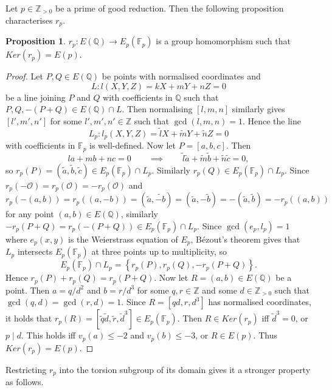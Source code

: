 \documentclass{article}
\newcommand{\F}{\mathbb{F}}
\newcommand{\Z}{\mathbb{Z}}
\newcommand{\Q}{\mathbb{Q}}
\newcommand{\rb}[1]{\left( #1 \right)}
\renewcommand{\sb}[1]{\left[ #1 \right]}
\newcommand{\cb}[1]{\left\{ #1 \right\}}
\theoremstyle{definition}
\newtheorem{proposition}{Proposition}[subsection]
\begin{document}
\pagebreak

Let $ p \in \Z_{> 0} $ be a prime of good reduction. Then the following proposition characterises $ r_p $.

\begin{proposition}
$ r_p : E\rb{\Q} \to E_p\rb{\F_p} $ is a group homomorphism such that $ Ker\rb{r_p} = E\rb{p} $.
\end{proposition}

\begin{proof}
Let $ P, Q \in E\rb{\Q} $ be points with normalised coordinates and
$$ L : l\rb{X, Y, Z} = kX + mY + nZ = 0 $$
be a line joining $ P $ and $ Q $ with coefficients in $ \Q $ such that $ P, Q, -\rb{P + Q} \in E\rb{\Q} \cap L $. Then normalising $ \sb{l, m, n} $ similarly gives $ \sb{l', m', n'} $ for some $ l', m', n '\in \Z $ such that $ \gcd\rb{l, m, n} = 1 $. Hence the line
$$ L_p : l_p\rb{X, Y, Z} = \tilde{l}X + \tilde{m}Y + \tilde{n}Z = 0 $$
with coefficients in $ \F_p $ is well-defined. Now let $ P = \sb{a, b, c} $. Then
$$ la + mb + nc = 0 \qquad \implies \qquad \tilde{l}\tilde{a} + \tilde{m}\tilde{b} + \tilde{n}\tilde{c} = 0, $$
so $ r_p\rb{P} = \rb{\tilde{a}, \tilde{b}, \tilde{c}} \in E_p\rb{\F_p} \cap L_p $. Similarly $ r_p\rb{Q} \in E_p\rb{\F_p} \cap L_p $. Since $ r_p\rb{-\mathcal{O}} = r_p\rb{\mathcal{O}} = -r_p\rb{\mathcal{O}} $ and
$$ r_p\rb{-\rb{a, b}} = r_p\rb{\rb{a, -b}} = \rb{\tilde{a}, \tilde{-b}} = \rb{\tilde{a}, -\tilde{b}} = -\rb{\tilde{a}, \tilde{b}} = -r_p\rb{\rb{a, b}} $$
for any point $ \rb{a, b} \in E\rb{\Q} $, similarly $ -r_p\rb{P + Q} = r_p\rb{-\rb{P + Q}} \in E_p\rb{\F_p} \cap L_p $. Since $ \gcd\rb{e_p, l_p} = 1 $ where $ e_p\rb{x, y} $ is the Weierstrass equation of $ E_p $, B\'ezout's theorem gives that $ L_p $ intersects $ E_p\rb{\F_p} $ at three points up to multiplicity, so
$$ E_p\rb{\F_p} \cap L_p = \cb{r_p\rb{P}, r_p\rb{Q}, -r_p\rb{P + Q}}. $$
Hence $ r_p\rb{P} + r_p\rb{Q} = r_p\rb{P + Q} $. Now let $ R = \rb{a, b} \in E\rb{\Q} $ be a point. Then $ a = q / d^2 $ and $ b = r / d^3 $ for some $ q, r \in \Z $ and some $ d \in \Z_{> 0} $ such that $ \gcd\rb{q, d} = \gcd\rb{r, d} = 1 $. Since $ R = \sb{qd, r, d^3} $ has normalised coordinates, it holds that $ r_p\rb{R} = \sb{\tilde{q}\tilde{d}, \tilde{r}, \tilde{d}^3} \in E_p\rb{\F_p} $. Then $ R \in Ker\rb{r_p} $ iff $ \tilde{d}^3 = 0 $, or $ p \mid d $. This holds iff $ v_p\rb{a} \le -2 $ and $ v_p\rb{b} \le -3 $, or $ R \in E\rb{p} $. Thus $ Ker\rb{r_p} = E\rb{p} $.
\end{proof}

Restricting $ r_p $ into the torsion subgroup of its domain gives it a stronger property as follows.
\end{document}
